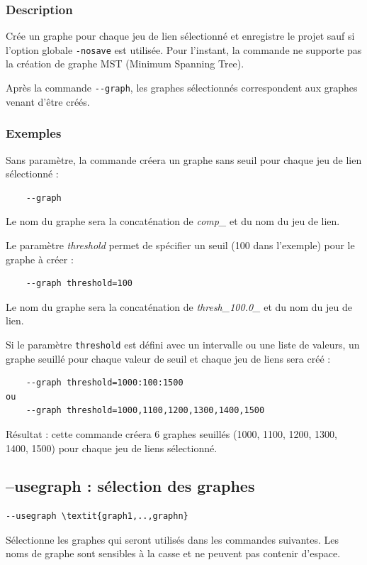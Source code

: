 \documentclass[a4paper,10pt]{report}
\begin{document}
\subsubsection{Description}
Crée un graphe pour chaque jeu de lien sélectionné et enregistre le projet sauf si l'option globale \verb|-nosave| est utilisée.
Pour l'instant, la commande ne supporte pas la création de graphe MST (Minimum Spanning Tree).

Après la commande \verb|--graph|, les graphes sélectionnés correspondent aux graphes venant d'être créés.

\subsubsection{Exemples}
Sans paramètre, la commande créera un graphe sans seuil pour chaque jeu de lien sélectionné :
\begin{Verbatim}
	--graph
\end{Verbatim}
Le nom du graphe sera la concaténation de \textit{comp\_} et du nom du jeu de lien.

Le paramètre \textit{threshold} permet de spécifier un seuil (100 dans l'exemple) pour le graphe à créer :
\begin{Verbatim}
	--graph threshold=100
\end{Verbatim}
Le nom du graphe sera la concaténation de  \textit{thresh\_100.0\_} et du nom du jeu de lien.

Si le paramètre \verb|threshold| est défini avec un intervalle ou une liste de valeurs, un graphe seuillé pour chaque valeur de seuil et chaque jeu de liens sera créé :
\begin{Verbatim}
	--graph threshold=1000:100:1500
ou
	--graph threshold=1000,1100,1200,1300,1400,1500
\end{Verbatim}
Résultat : cette commande créera 6 graphes seuillés (1000, 1100, 1200, 1300, 1400, 1500) pour chaque jeu de liens sélectionné.


\subsection{--usegraph : sélection des graphes}
\label{usegraph}
\begin{Verbatim}[commandchars=\\\{\}]
--usegraph \textit{graph1,..,graphn}
\end{Verbatim}
Sélectionne les graphes qui seront utilisés dans les commandes suivantes.
Les noms de graphe sont sensibles à la casse et ne peuvent pas contenir d'espace.
\end{document}
